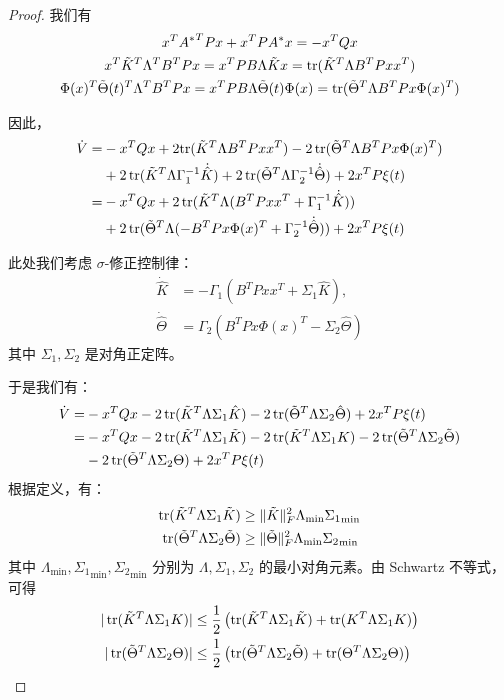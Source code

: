 \begin{proof}
     我们有
     \begin{gather*}
         x^T {A^*}^TPx+x^TPA^*x=-x^TQx \\
         x^T\tilde{K}^T\Lambda^TB^TPx=x^TPB\Lambda\tilde{K}x = \operatorname{tr} (\tilde{K}^T\Lambda B^TPxx^T) \\
         \Phi(x)^T\tilde\Theta(t)^T\Lambda^TB^TPx=x^TPB\Lambda \tilde \Theta(t)\Phi(x) =\operatorname{tr} (\tilde{\Theta}^T\Lambda B^TPx\Phi(x)^T)
     \end{gather*}

     因此，
     \begin{align*}
        \dot{V}=&-x^TQx+2\text{tr}(\tilde{K}^T\Lambda B^TPxx^T)-2\operatorname{tr}(\tilde{\Theta}^T\Lambda B^TPx\Phi(x)^T)
        \\
        &+2\operatorname{tr} (  \tilde{K}^T \Lambda\Gamma_1^{-1}  \dot{\hat{K}})+2\operatorname{tr} (  \tilde{\Theta}^T \Lambda\Gamma_2^{-1}  \dot{\hat{\Theta}})+2x^TP\xi(t)\\
        =&-x^TQx+2\operatorname{tr}(\tilde{K}^T\Lambda( B^TPxx^T+\Gamma_1^{-1}  \dot{\hat{K}}))\\&+2\operatorname{tr}(\tilde{\Theta}^T\Lambda(- B^TPx\Phi(x)^T+\Gamma_2^{-1}  \dot{\hat{\Theta}}))+2x^TP\xi(t)
    \end{align*}

    此处我们考虑 $\sigma$-修正控制律：
    \begin{align*}
        \dot{\hat{K}}&=-\Gamma_1(B^TPxx^T+\Sigma_1\hat{K}), \\ \dot{\hat{\Theta}}&=\Gamma_2(B^TPx\Phi(x)^T-\Sigma_2\hat{\Theta})
    \end{align*}
    其中 $\Sigma_1, \Sigma_2$ 是对角正定阵。

    于是我们有：
    \begin{align*}
        \dot{V}=&-x^TQx-2\operatorname{tr}(\tilde{K}^T\Lambda\Sigma_1\hat{K})-2\operatorname{tr}(\tilde{\Theta}^T\Lambda\Sigma_2\hat{\Theta})+2x^TP\xi(t)\\
        =&-x^TQx-2\operatorname{tr}(\tilde{K}^T\Lambda\Sigma_1\tilde{K})-2\operatorname{tr}(\tilde{K}^T\Lambda\Sigma_1 K)-2\operatorname{tr}(\tilde{\Theta}^T\Lambda\Sigma_2\tilde{\Theta})\\
        &-2\operatorname{tr}(\tilde{\Theta}^T\Lambda\Sigma_2\Theta)+2x^TP\xi(t)
    \end{align*}
    根据定义，有：
    \begin{align*}
        \operatorname{tr}(\tilde{K}^T\Lambda\Sigma_1\tilde{K})&\geq \|\tilde{K}\|_F^2\Lambda_{\mathrm{min}}{\Sigma_1}_{\mathrm{min}} \\
        \operatorname{tr}(\tilde{\Theta}^T\Lambda\Sigma_2\tilde{\Theta})&\geq \|\tilde{\Theta}\|_F^2\Lambda_{\mathrm{min}}{\Sigma_2}_{\mathrm{min}}
    \end{align*}
    其中 $\Lambda_{\mathrm{min}}, {\Sigma_1}_{\mathrm{min}}, {\Sigma_2}_{\mathrm{min}}$ 分别为 $\Lambda, \Sigma_1, \Sigma_2$ 的最小对角元素。由 Schwartz 不等式，可得
    \begin{align*}
        |\operatorname{tr}(\tilde{K}^T\Lambda\Sigma_1 K)| &\leq \dfrac{1}{2} \left( \operatorname{tr}(\tilde{K}^T \Lambda\Sigma_1 \tilde{K}) + \operatorname{tr}(K^T \Lambda\Sigma_1 K) \right) \\
        |\operatorname{tr}(\tilde{\Theta}^T\Lambda\Sigma_2 \Theta)| &\leq \dfrac{1}{2} \left( \operatorname{tr}(\tilde{\Theta}^T \Lambda\Sigma_2 \tilde{\Theta}) + \operatorname{tr}(\Theta^T \Lambda\Sigma_2 \Theta) \right)
    \end{align*}


\end{proof}
